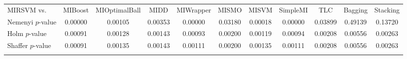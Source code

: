 \begin{table}[t!]
{}
\label{fig:BonfDunnkappa}
\vspace{0.5cm}
\label{tab:statkappa}
\scriptsize
\begin{tabularx}{\textwidth}{lcccccccccc}\noalign{\smallskip}\hline\noalign{\smallskip}
MIRSVM vs. & MIBoost & MIOptimalBall & MIDD & MIWrapper & MISMO & MISVM & SimpleMI & TLC & Bagging & Stacking\\
\noalign{\smallskip}\hline\noalign{\smallskip}
Nemenyi $p$-value & 0.00000 & 0.00105 & 0.00353 & 0.00000 & 0.03180 & 0.00018 & 0.00000 & 0.03899 & 0.49139 & 0.13720\\
Holm $p$-value & 0.00091 & 0.00128 & 0.00143 & 0.00093 & 0.00200 & 0.00119 & 0.00094 & 0.00208 & 0.00556 & 0.00263\\
Shaffer $p$-value & 0.00091 & 0.00135 & 0.00143 & 0.00111 & 0.00200 & 0.00135 & 0.00111 & 0.00208 & 0.00556 & 0.00263\\
\noalign{\smallskip}\hline\noalign{\smallskip}
\end{tabularx}
\end{table}
\bigskip
